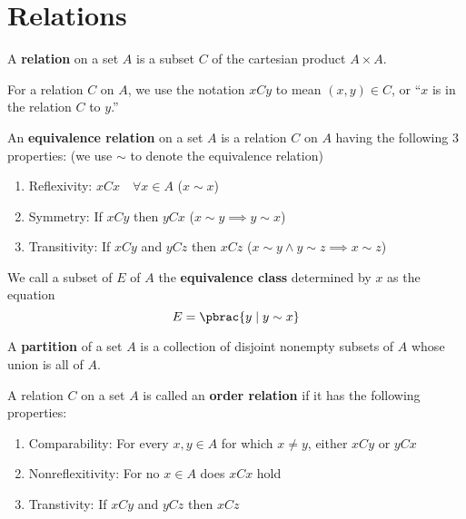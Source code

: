 \section{Relations}

\begin{definition}
  A \textbf{relation} on a set $A$ is a subset $C$ of the cartesian product $A \times A$.

  For a relation $C$ on $A$, we use the notation $xCy$ to mean $(x, y) \in C$, or ``$x$ is in the relation $C$ to $y$.''
\end{definition}

\begin{definition}
  An \textbf{equivalence relation} on a set $A$ is a relation $C$ on $A$ having the following 3 properties: (we use $\sim$ to denote the equivalence relation)
  \begin{enumerate}
    \item Reflexivity: $xCx \quad \forall x \in A$ ($x \sim x$)
    \item Symmetry: If $xCy$ then $yCx$ ($x \sim y \implies y \sim x$)
    \item Transitivity: If $xCy$ and $yCz$ then $xCz$ ($x \sim y \land y \sim z \implies x \sim z$)
  \end{enumerate}
\end{definition}

\begin{definition}
  We call a subset of $E$ of $A$ the \textbf{equivalence class} determined by $x$ as the equation
  \begin{equation}
    E = \pbrac{
      y \mid y \sim x
    }
  \end{equation}
\end{definition}

\begin{definition}
  A \textbf{partition} of a set $A$ is a collection of disjoint nonempty subsets of $A$ whose union is all of $A$.
\end{definition}

\begin{definition}
  A relation $C$ on a set $A$ is called an \textbf{order relation} if it has the following properties:
  \begin{enumerate}
    \item Comparability: For every $x, y \in A$ for which $x \neq y$, either $xCy$ or $yCx$
    \item Nonreflexitivity: For no $x \in A$ does $xCx$ hold
    \item Transtivity: If $xCy$ and $yCz$ then $xCz$
  \end{enumerate}
\end{definition}

